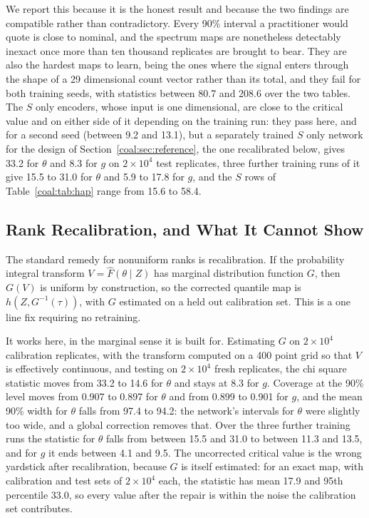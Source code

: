 We report this because it is the honest result and because the two findings are compatible rather than contradictory. Every 90\% interval a practitioner would quote is close to nominal, and the spectrum maps are nonetheless detectably inexact once more than ten thousand replicates are brought to bear. They are also the hardest maps to learn, being the ones where the signal enters through the shape of a 29 dimensional count vector rather than its total, and they fail for both training seeds, with statistics between 80.7 and 208.6 over the two tables. The $S$ only encoders, whose input is one dimensional, are close to the critical value and on either side of it depending on the training run: they pass here, and for a second seed (between 9.2 and 13.1), but a separately trained $S$ only network for the design of Section~\ref{coal:sec:reference}, the one recalibrated below, gives 33.2 for $\theta$ and 8.3 for $g$ on $2\times10^4$ test replicates, three further training runs of it give 15.5 to 31.0 for $\theta$ and 5.9 to 17.8 for $g$, and the $S$ rows of Table~\ref{coal:tab:hap} range from 15.6 to 58.4.

\subsection{Rank Recalibration, and What It Cannot Show}\label{coal:sec:repair}

The standard remedy for nonuniform ranks is recalibration. If the probability integral transform $V=\hat F(\theta\mid Z)$ has marginal distribution function $G$, then $G(V)$ is uniform by construction, so the corrected quantile map is $h(Z,G^{-1}(\tau))$, with $G$ estimated on a held out calibration set. This is a one line fix requiring no retraining.

It works here, in the marginal sense it is built for. Estimating $G$ on $2\times10^4$ calibration replicates, with the transform computed on a 400 point grid so that $V$ is effectively continuous, and testing on $2\times10^4$ fresh replicates, the chi square statistic moves from 33.2 to 14.6 for $\theta$ and stays at 8.3 for $g$. Coverage at the 90\% level moves from 0.907 to 0.897 for $\theta$ and from 0.899 to 0.901 for $g$, and the mean 90\% width for $\theta$ falls from 97.4 to 94.2: the network's intervals for $\theta$ were slightly too wide, and a global correction removes that. Over the three further training runs the statistic for $\theta$ falls from between 15.5 and 31.0 to between 11.3 and 13.5, and for $g$ it ends between 4.1 and 9.5. The uncorrected critical value is the wrong yardstick after recalibration, because $G$ is itself estimated: for an exact map, with calibration and test sets of $2\times10^4$ each, the statistic has mean 17.9 and 95th percentile 33.0, so every value after the repair is within the noise the calibration set contributes.

